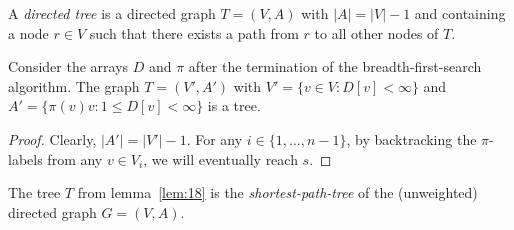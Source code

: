 
  


\begin{definition}
  \label{def:t6}
  A \emph{directed  tree} is a directed graph $T = (V,A)$ with 
  $|A| = |V| -1$ and containing a node $r \in V$ such that there 
  exists a path from $r$ to all other nodes of $T$. 
\end{definition}



\begin{lemma}
  \label{lem:18}
  Consider the arrays $D$ and $\pi$ after the termination of the
  breadth-first-search algorithm. 
  The graph $T = (V',A')$ with $V' = \{v \in V \colon D[v]<\infty\}$ and $A' =
  \{ \pi(v) v \colon 1\leq D[v]<\infty\}$ is a tree. 
\end{lemma}


\begin{proof}
  Clearly, $|A'| = |V'| -1$. For any $i \in \{1,\ldots,n-1\}$, by
  backtracking the $\pi$-labels from any $v \in V_i$, we will eventually
  reach $s$.
\end{proof}

\begin{definition}
  \label{def:t7}
  The tree $T$ from lemma~\ref{lem:18} is the \emph{shortest-path-tree}
   of the (unweighted) directed graph $G = (V,A)$. 
\end{definition}


